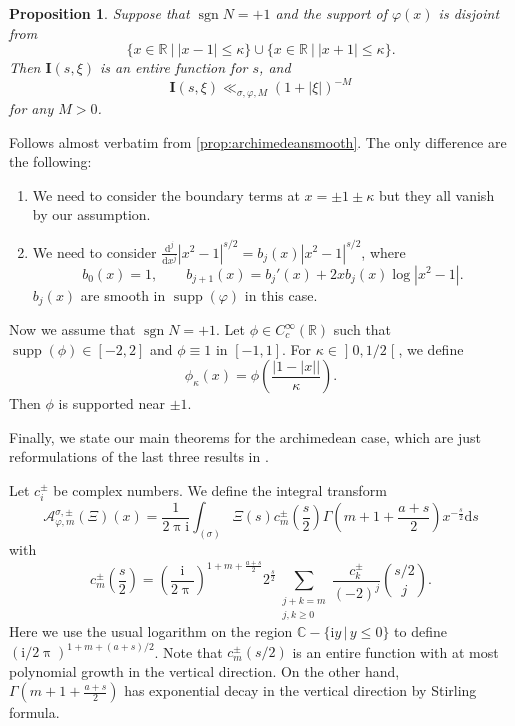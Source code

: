 \documentclass[10pt,oneside,reqno]{amsart}
\makeatletter
\newcommand\lopen{\mathopen{]}}
\newcommand\ropen{\mathclose{[}}
\newcommand\rmd{\mathrm{d}}
\newcommand\rmi{\mathrm{i}}
\newcommand\cA{\mathcal{A}}
\newcommand\bI{\mathbf{I}}
\newcommand\CC{\mathbb{C}}
\newcommand\RR{\mathbb{R}}
\newcommand\dpii{2\uppi\rmi}
\DeclareMathOperator\sgn{sgn}
\DeclareMathOperator\supp{supp}
\renewcommand\leq{\leqslant}
\renewcommand\geq{\geqslant}
\newcommand\legendresymbol[2]{\genfrac{(}{)}{}{}{#1}{#2}}
\theoremstyle{THEOREM}
\newtheorem{proposition}[theorem]{Proposition}
\theoremstyle{DEFINITION}
\theoremstyle{EXERCISE}
\numberwithin{equation}{section}
\renewenvironment{proof}[1][\proofname]{\par
  \vspace{-6pt}
  \pushQED{\qed}
  \normalfont \topsep6\p@\@plus6\p@\relax
  \trivlist
  \item[\hskip\labelsep\rmfamily\bfseries
    #1\@addpunct{:}]\ignorespaces
}{
  \popQED\endtrivlist\@endpefalse
  \vspace{-6pt}
}
\makeatother
\begin{document}
\begin{proposition}\label{prop:archimedeannonsingular}
Suppose that $\sgn N=+1$ and the support of $\varphi(x)$ is disjoint from
\[
\{x\in \RR\ |\ |x-1| \leq \kappa\}\cup \{x\in \RR\ |\ |x+1|\leq \kappa\}.
\]
Then $\bI(s,\xi)$ is an entire function for $s$, and
\[
\bI(s,\xi)\ll_{\sigma,\varphi,M} (1+|\xi|)^{-M}
\]
for any $M>0$.
\end{proposition}
\begin{proof}
Follows almost verbatim from \autoref{prop:archimedeansmooth}. The only difference are the following:
\begin{enumerate}[itemsep=0pt,parsep=0pt,topsep=0pt, leftmargin=0pt,labelsep=2.5pt,itemindent=9pt,label=\textbullet]
  \item 
We need to consider the boundary terms at $x=\pm 1\pm \kappa$ but they all vanish by our assumption.
\item We need to consider $\frac{\rmd^j}{\rmd x^j}|x^2-1|^{s/2}=b_j(x)|x^2-1|^{s/2}$, where 
\[
b_0(x)=1,\qquad b_{j+1}(x)=b_j'(x)+2xb_j(x)\log|x^2-1|.
\]
$b_j(x)$ are smooth in $\supp(\varphi)$ in this case. \qedhere
\end{enumerate}
\end{proof}

Now we assume that $\sgn N=+1$.
Let $\phi\in C_c^\infty(\RR)$ such that $\supp(\phi)\in [-2,2]$ and $\phi\equiv 1$ in $[-1,1]$. For $\kappa\in \lopen0,1/2\ropen$, we define
\[
\phi_\kappa(x)=\phi\left(\frac{|1-|x||}{\kappa}\right).
\]
Then $\phi$ is supported near $\pm 1$. 

Finally, we state our main theorems for the archimedean case, which are just reformulations of the last three results in \cite[Appendix A]{altug2017}.

Let $c_i^\pm$ be complex numbers. We define the integral transform
\[
\cA_{\varphi,m}^{\sigma,\pm}(\Xi)(x)=\frac{1}{\dpii}\int_{(\sigma)}\Xi(s) c_m^\pm\legendresymbol{s}{2}\Gamma\left(m+1+\frac{a+s}{2}\right)x^{-\frac s2}\rmd s
\]
with
\[
c_m^\pm \legendresymbol{s}{2}=\legendresymbol{\rmi}{2\uppi}^{1+m+\frac{a+s}{2}}2^{\frac s2}\sum_{\substack{j+k=m\\ j,k\geq 0}}\frac{c_k^\pm}{(-2)^j}\binom{s/2}{j}.
\]
Here we use the usual logarithm on the region $\CC-\{\rmi y\,|\, y\leq 0\}$ to define $(\rmi/2\uppi)^{1+m+(a+s)/2}$.
Note that $c_m^\pm(s/2)$ is an entire function with at most polynomial growth in the vertical direction. On the other hand, $\Gamma(m+1+\frac{a+s}{2})$ has exponential decay in the vertical direction by Stirling formula.
\end{document}
